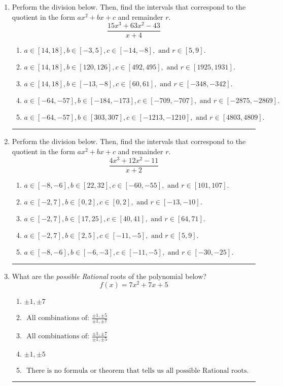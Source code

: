 \documentclass[14pt]{extbook}
\newcommand{\litem}[1]{\item#1\hspace*{-1cm}\rule{\textwidth}{0.4pt}}
\begin{document}
\begin{enumerate}
{\begin{enumerate}[label=\Alph*.]
\end{enumerate} }
\litem{
Perform the division below. Then, find the intervals that correspond to the quotient in the form $ax^2+bx+c$ and remainder $r$.\[ \frac{15x^{3} +63 x^{2} -43}{x + 4} \]\begin{enumerate}[label=\Alph*.]
\item \( a \in [14, 18], b \in [-3, 5], c \in [-14, -8], \text{ and } r \in [5, 9]. \)
\item \( a \in [14, 18], b \in [120, 126], c \in [492, 495], \text{ and } r \in [1925, 1931]. \)
\item \( a \in [14, 18], b \in [-13, -8], c \in [60, 61], \text{ and } r \in [-348, -342]. \)
\item \( a \in [-64, -57], b \in [-184, -173], c \in [-709, -707], \text{ and } r \in [-2875, -2869]. \)
\item \( a \in [-64, -57], b \in [303, 307], c \in [-1213, -1210], \text{ and } r \in [4803, 4809]. \)

\end{enumerate} }
\litem{
Perform the division below. Then, find the intervals that correspond to the quotient in the form $ax^2+bx+c$ and remainder $r$.\[ \frac{4x^{3} +12 x^{2} -11}{x + 2} \]\begin{enumerate}[label=\Alph*.]
\item \( a \in [-8, -6], b \in [22, 32], c \in [-60, -55], \text{ and } r \in [101, 107]. \)
\item \( a \in [-2, 7], b \in [0, 2], c \in [0, 2], \text{ and } r \in [-13, -10]. \)
\item \( a \in [-2, 7], b \in [17, 25], c \in [40, 41], \text{ and } r \in [64, 71]. \)
\item \( a \in [-2, 7], b \in [2, 5], c \in [-11, -5], \text{ and } r \in [5, 9]. \)
\item \( a \in [-8, -6], b \in [-6, -3], c \in [-11, -5], \text{ and } r \in [-30, -25]. \)

\end{enumerate} }
\litem{
What are the \textit{possible Rational} roots of the polynomial below?\[ f(x) = 7x^{2} +7 x + 5 \]\begin{enumerate}[label=\Alph*.]
\item \( \pm 1,\pm 7 \)
\item \( \text{ All combinations of: }\frac{\pm 1,\pm 5}{\pm 1,\pm 7} \)
\item \( \text{ All combinations of: }\frac{\pm 1,\pm 7}{\pm 1,\pm 5} \)
\item \( \pm 1,\pm 5 \)
\item \( \text{ There is no formula or theorem that tells us all possible Rational roots.} \)


\end{enumerate}}
\end{enumerate}
\end{document}
